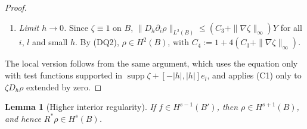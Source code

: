 \documentclass[11pt]{article}
\theoremstyle{plain}
\newtheorem{lemma}[theorem]{Lemma}
\theoremstyle{definition}
\theoremstyle{remark}
\begin{document}
\begin{proof}
\begin{enumerate}
  \begin{align*}
    |(f,\varphi_h)_\mu| &\le \mu_+\|f\|\,Z_1X, &
    |(F,E'_h)_\mu| &\le \mu_+N_1\|\rho\|_{H^1}\,N_2Z_1X,\\
    \Bigl|\int\langle F,\mathcal T_{-h}G_h\rangle D_{-h}\mu\Bigr| &\le L_\mu N_1\|\rho\|_{H^1}\,N_1Z_1X, &
    |(E_h,G_h)_\mu| &\le \mu_+N_2\|\rho\|_{H^1}\,N_1Z_1X .
  \end{align*}
  Each right side is at most the corresponding term of $C_1YX$ below; the two terms $\mu_+N_1N_2$ come from $E'_h$ and $E_h$. Hence
  \[
    |(R^*w_h,G_h)_\mu| \le C_1YX,\qquad C_1 := Z_1\bigl(\mu_+ + 2\mu_+N_1N_2 + L_\mu N_1^2\bigr).
  \]
  The exact form of $C_1,\dots,C_4$ is not needed: only their independence of $h$ is used.
  Also $\|S_\zeta w_h\|_\mu^2 \le C_2Y^2$, using $\|w_h\| \le \|\nabla\rho\| \le Y$, with $C_2 := \mu_+\bigl(\sum_j\|M_j\|_\infty\|\partial_j\zeta\|_\infty\bigr)^2$. By (C1) applied to $v_h$, $c_0^2X^2 \le C_1YX + C_2Y^2$. Young's inequality gives $X \le C_3Y$ with $C_3 := (C_1^2/c_0^4 + 2C_2/c_0^2)^{1/2}$. Since $X < \infty$ for each fixed $h$, the argument is not circular.
  \item \emph{Limit $h \to 0$.} Since $\zeta \equiv 1$ on $B$, $\|D_h\partial_i\rho\|_{L^2(B)} \le (C_3 + \|\nabla\zeta\|_\infty)Y$ for all $i$, $l$ and small $h$. By (DQ2), $\rho \in H^2(B)$, with $C_4 := 1 + 4(C_3 + \|\nabla\zeta\|_\infty)$.
\end{enumerate}
The local version follows from the same argument, which uses the equation only with test functions supported in $\operatorname{supp}\zeta + [-|h|,|h|]e_l$, and applies (C1) only to $\zeta D_h\rho$ extended by zero.
\end{proof}

\begin{lemma}[Higher interior regularity]\label{lem:hs}
If $f \in H^{s-1}(B')$, then $\rho \in H^{s+1}(B)$, and hence $R^*\rho \in H^s(B)$.
\end{lemma}
\end{document}
